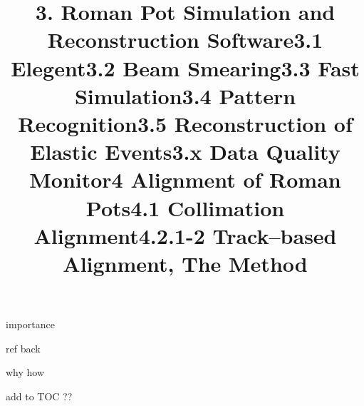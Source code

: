 \newpage%
\title{3. Roman Pot Simulation and Reconstruction Software}

\> importance


\newpage%
\title{3.1 Elegent}

\> ref back

\title{3.2 Beam Smearing}


\newpage%
\title{3.3 Fast Simulation}

\> why
\> how

\title{3.4 Pattern Recognition}


\newpage%
\title{3.5 Reconstruction of Elastic Events}


\newpage%
\title{3.x Data Quality Monitor}

\> add to TOC ??



\newpage%
\title{4 Alignment of Roman Pots}

\newpage%
\title{4.1 Collimation Alignment}


\newpage%
\title{4.2.1-2 Track--based Alignment, The Method}

